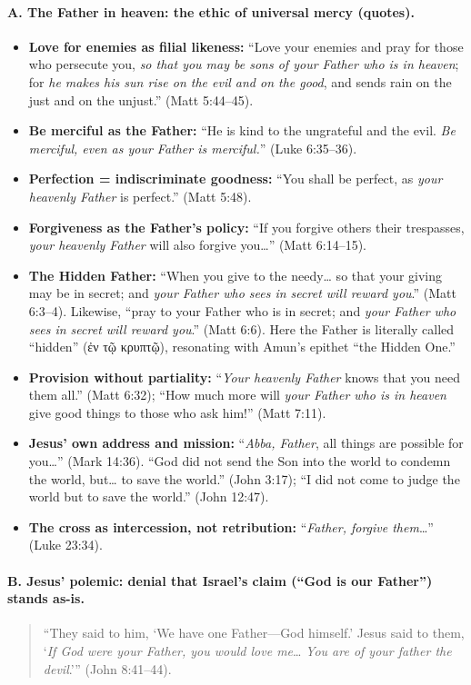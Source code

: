 \paragraph{A. The Father in heaven: the ethic of universal mercy (quotes).}
\begin{itemize}
    \item \textbf{Love for enemies as filial likeness:} “Love your enemies and pray for those who persecute you, \emph{so that you may be sons of your Father who is in heaven}; for \emph{he makes his sun rise on the evil and on the good}, and sends rain on the just and on the unjust.” (Matt 5:44--45).
    \item \textbf{Be merciful as the Father:} “He is kind to the ungrateful and the evil. \emph{Be merciful, even as your Father is merciful.}” (Luke 6:35--36).
    \item \textbf{Perfection = indiscriminate goodness:} “You shall be perfect, as \emph{your heavenly Father} is perfect.” (Matt 5:48).
    \item \textbf{Forgiveness as the Father’s policy:} “If you forgive others their trespasses, \emph{your heavenly Father} will also forgive you…” (Matt 6:14--15).
    \item \textbf{The Hidden Father:} “When you give to the needy… so that your giving may be in secret; and \emph{your Father who sees in secret will reward you}.” (Matt 6:3--4). Likewise, “pray to your Father who is in secret; and \emph{your Father who sees in secret will reward you}.” (Matt 6:6). Here the Father is literally called “hidden” (ἐν τῷ κρυπτῷ), resonating with Amun’s epithet “the Hidden One.”
    \item \textbf{Provision without partiality:} “\emph{Your heavenly Father} knows that you need them all.” (Matt 6:32); “How much more will \emph{your Father who is in heaven} give good things to those who ask him!” (Matt 7:11).
    \item \textbf{Jesus’ own address and mission:} “\emph{Abba, Father}, all things are possible for you…” (Mark 14:36). “God did not send the Son into the world to condemn the world, but… to save the world.” (John 3:17); “I did not come to judge the world but to save the world.” (John 12:47).
    \item \textbf{The cross as intercession, not retribution:} “\emph{Father, forgive them}…” (Luke 23:34).
\end{itemize}

\paragraph{B. Jesus’ polemic: denial that Israel’s claim (“God is our Father”) stands as-is.}
\begin{quote}
    “They said to him, ‘We have one Father---God himself.’ Jesus said to them, ‘\emph{If God were your Father, you would love me}… \emph{You are of your father the devil}.’” (John 8:41--44).
\end{quote}


